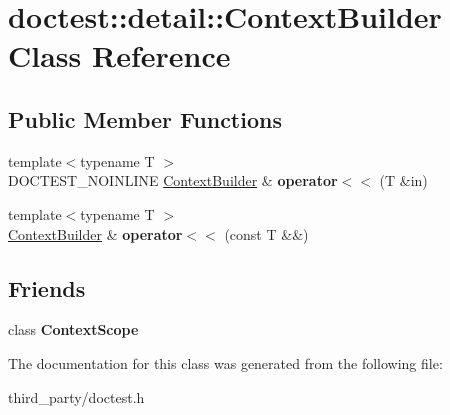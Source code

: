 \hypertarget{classdoctest_1_1detail_1_1_context_builder}{}\section{doctest\+::detail\+::Context\+Builder Class Reference}
\label{classdoctest_1_1detail_1_1_context_builder}
\subsection*{Public Member Functions}
\begin{DoxyCompactItemize}
\item 
\mbox{\label{classdoctest_1_1detail_1_1_context_builder_a60cb3f49c01f051571e1c0e41e0d007a}} 
{\footnotesize template$<$typename T $>$ }\\D\+O\+C\+T\+E\+S\+T\+\_\+\+N\+O\+I\+N\+L\+I\+NE \mbox{\hyperlink{classdoctest_1_1detail_1_1_context_builder}{Context\+Builder}} \& {\bfseries operator$<$$<$} (T \&in)
\item 
\mbox{\label{classdoctest_1_1detail_1_1_context_builder_a1dc467ed8a9646a6c5a9d13a2963530d}} 
{\footnotesize template$<$typename T $>$ }\\\mbox{\hyperlink{classdoctest_1_1detail_1_1_context_builder}{Context\+Builder}} \& {\bfseries operator$<$$<$} (const T \&\&)
\end{DoxyCompactItemize}
\subsection*{Friends}
\begin{DoxyCompactItemize}
\item 
\mbox{\label{classdoctest_1_1detail_1_1_context_builder_a2866aa0f94eedf47f5341709ac89b15b}} 
class {\bfseries Context\+Scope}
\end{DoxyCompactItemize}


The documentation for this class was generated from the following file\+:\begin{DoxyCompactItemize}
\item 
third\+\_\+party/doctest.\+h\end{DoxyCompactItemize}

